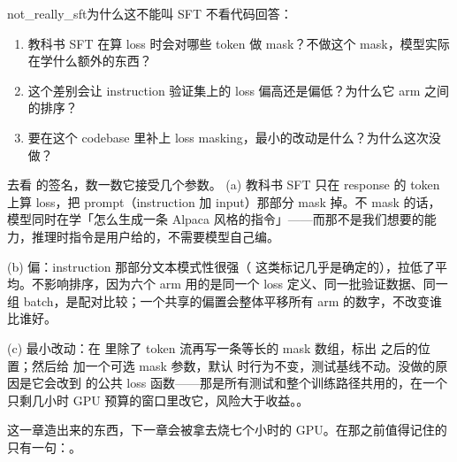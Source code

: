\begin{checkpoint}{not_really_sft}{为什么这不能叫 SFT}
不看代码回答：
\begin{enumerate}[label=(\alph*)]
  \item 教科书 SFT 在算 loss 时会对哪些 token 做 mask？不做这个 mask，模型实际在学什么额外的东西？
  \item 这个差别会让 instruction 验证集上的 loss 偏高还是偏低？为什么它 arm 之间的排序？
  \item 要在这个 codebase 里补上 loss masking，最小的改动是什么？为什么这次没做？
\end{enumerate}
\hint 去看  的签名，数一数它接受几个参数。
\ifshowanswers
\tcblower
\answer (a) 教科书 SFT 只在 response 的 token 上算 loss，把 prompt（instruction 加 input）那部分 mask 掉。不 mask 的话，模型同时在学「怎么生成一条 Alpaca 风格的指令」——而那不是我们想要的能力，推理时指令是用户给的，不需要模型自己编。

(b) 偏：instruction 那部分文本模式性很强（ 这类标记几乎是确定的），拉低了平均。不影响排序，因为六个 arm 用的是同一个 loss 定义、同一批验证数据、同一组 batch，是配对比较；一个共享的偏置会整体平移所有 arm 的数字，不改变谁比谁好。

(c) 最小改动：在  里除了 token 流再写一条等长的 mask 数组，标出  之后的位置；然后给  加一个可选 mask 参数，默认  时行为不变，测试基线不动。没做的原因是它会改到  的公共 loss 函数——那是所有测试和整个训练路径共用的，在一个只剩几小时 GPU 预算的窗口里改它，风险大于收益。。
\whereincode {}
\fi
\end{checkpoint}

\medskip
\noindent 这一章造出来的东西，下一章会被拿去烧七个小时的 GPU。在那之前值得记住的只有一句：。
